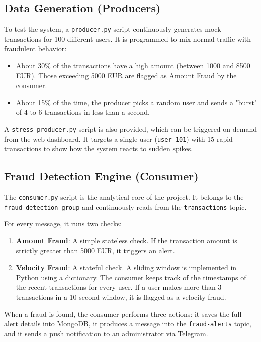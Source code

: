 \documentclass[11pt,a4paper]{article}
\begin{document}
\subsection{Data Generation (Producers)}
To test the system, a \texttt{producer.py} script continuously generates mock transactions for 100 different users. It is programmed to mix normal traffic with fraudulent behavior:
\begin{itemize}
    \item About 30\% of the transactions have a high amount (between 1000 and 8500 EUR). Those exceeding 5000 EUR are flagged as Amount Fraud by the consumer.
    \item About 15\% of the time, the producer picks a random user and sends a "burst" of 4 to 6 transactions in less than a second.
\end{itemize}

A \texttt{stress\_producer.py} script is also provided, which can be triggered on-demand from the web dashboard. It targets a single user (\texttt{user\_101}) with 15 rapid transactions to show how the system reacts to sudden spikes.

\subsection{Fraud Detection Engine (Consumer)}
The \texttt{consumer.py} script is the analytical core of the project. It belongs to the \texttt{fraud-detection-group} and continuously reads from the \texttt{transactions} topic. 

For every message, it runs two checks:
\begin{enumerate}
    \item \textbf{Amount Fraud}: A simple stateless check. If the transaction amount is strictly greater than 5000 EUR, it triggers an alert.
    \item \textbf{Velocity Fraud}: A stateful check. A sliding window is implemented in Python using a dictionary. The consumer keeps track of the timestamps of the recent transactions for every user. If a user makes more than 3 transactions in a 10-second window, it is flagged as a velocity fraud.
\end{enumerate}

When a fraud is found, the consumer performs three actions: it saves the full alert details into MongoDB, it produces a message into the \texttt{fraud-alerts} topic, and it sends a push notification to an administrator via Telegram.
\end{document}
